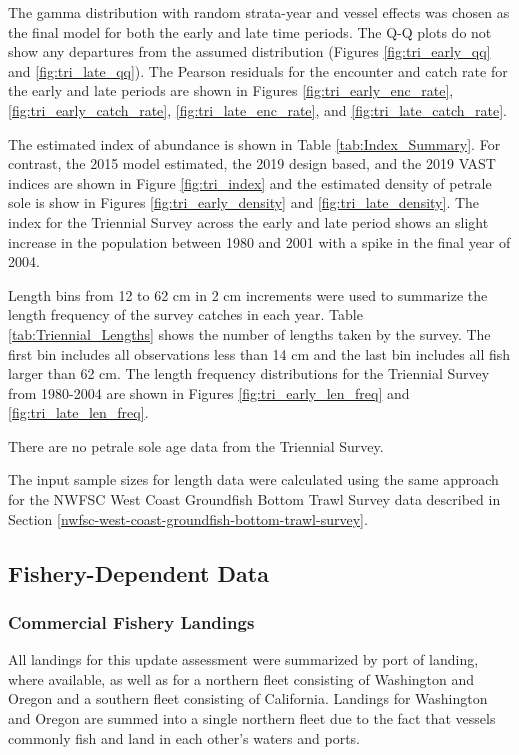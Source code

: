 \documentclass[12pt,]{article}
\begin{document}
The gamma distribution with random strata-year and vessel effects was
chosen as the final model for both the early and late time periods. The
Q-Q plots do not show any departures from the assumed distribution
(Figures \ref{fig:tri_early_qq} and \ref{fig:tri_late_qq}). The Pearson
residuals for the encounter and catch rate for the early and late
periods are shown in Figures \ref{fig:tri_early_enc_rate},
\ref{fig:tri_early_catch_rate}, \ref{fig:tri_late_enc_rate}, and
\ref{fig:tri_late_catch_rate}.

The estimated index of abundance is shown in Table
\ref{tab:Index_Summary}. For contrast, the 2015 model estimated, the
2019 design based, and the 2019 VAST indices are shown in Figure
\ref{fig:tri_index} and the estimated density of petrale sole is show in
Figures \ref{fig:tri_early_density} and \ref{fig:tri_late_density}. The
index for the Triennial Survey across the early and late period shows an
slight increase in the population between 1980 and 2001 with a spike in
the final year of 2004.

Length bins from 12 to 62 cm in 2 cm increments were used to summarize
the length frequency of the survey catches in each year. Table
\ref{tab:Triennial_Lengths} shows the number of lengths taken by the
survey. The first bin includes all observations less than 14 cm and the
last bin includes all fish larger than 62 cm. The length frequency
distributions for the Triennial Survey from 1980-2004 are shown in
Figures \ref{fig:tri_early_len_freq} and \ref{fig:tri_late_len_freq}.

There are no petrale sole age data from the Triennial Survey.

The input sample sizes for length data were calculated using the same
approach for the NWFSC West Coast Groundfish Bottom Trawl Survey data
described in Section
\ref{nwfsc-west-coast-groundfish-bottom-trawl-survey}.

\subsection{Fishery-Dependent Data}\label{fishery-dependent-data}

\subsubsection{Commercial Fishery
Landings}\label{commercial-fishery-landings}

All landings for this update assessment were summarized by port of
landing, where available, as well as for a northern fleet consisting of
Washington and Oregon and a southern fleet consisting of California.
Landings for Washington and Oregon are summed into a single northern
fleet due to the fact that vessels commonly fish and land in each
other's waters and ports.
\end{document}
